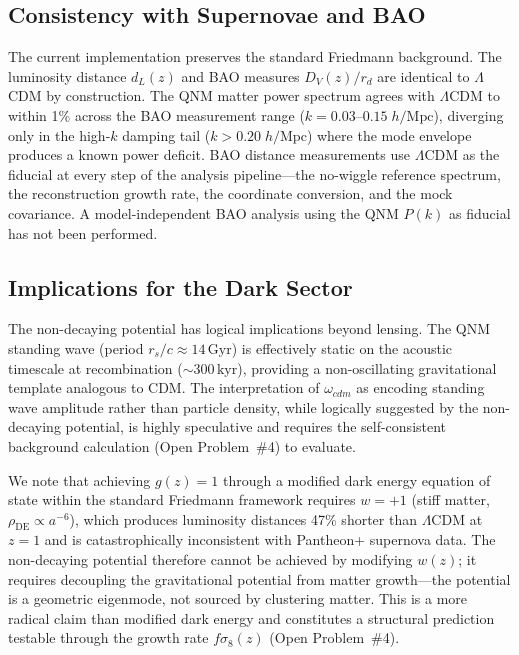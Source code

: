 \documentclass[aps,prd,twocolumn,superscriptaddress,showpacs,preprintnumbers,amsmath,amssymb,nofootinbib]{revtex4-2}
\newcommand{\lcdm}{$\Lambda$CDM}
\newcommand{\Gyr}{\,\mathrm{Gyr}}
\begin{document}
\subsection{Consistency with Supernovae and BAO}
\label{sec:sn_bao}

The current implementation preserves the standard Friedmann background. The luminosity distance $d_L(z)$ and BAO measures $D_V(z)/r_d$ are identical to \lcdm{} by construction. The QNM matter power spectrum agrees with \lcdm{} to within 1\% across the BAO measurement range ($k = 0.03$--$0.15\;h/\mathrm{Mpc}$), diverging only in the high-$k$ damping tail ($k > 0.20\;h/\mathrm{Mpc}$) where the mode envelope produces a known power deficit. BAO distance measurements use \lcdm{} as the fiducial at every step of the analysis pipeline---the no-wiggle reference spectrum, the reconstruction growth rate, the coordinate conversion, and the mock covariance. A model-independent BAO analysis using the QNM $P(k)$ as fiducial has not been performed.


\subsection{Implications for the Dark Sector}
\label{sec:dark}

The non-decaying potential has logical implications beyond lensing. The QNM standing wave (period $r_s/c \approx 14\Gyr$) is effectively static on the acoustic timescale at recombination ($\sim 300\,\mathrm{kyr}$), providing a non-oscillating gravitational template analogous to CDM. The interpretation of $\omega_{cdm}$ as encoding standing wave amplitude rather than particle density, while logically suggested by the non-decaying potential, is highly speculative and requires the self-consistent background calculation (Open Problem~\#4) to evaluate.

We note that achieving $g(z) = 1$ through a modified dark energy equation of state within the standard Friedmann framework requires $w = +1$ (stiff matter, $\rho_\mathrm{DE} \propto a^{-6}$), which produces luminosity distances 47\% shorter than \lcdm{} at $z = 1$ and is catastrophically inconsistent with Pantheon+ supernova data. The non-decaying potential therefore cannot be achieved by modifying $w(z)$; it requires decoupling the gravitational potential from matter growth---the potential is a geometric eigenmode, not sourced by clustering matter. This is a more radical claim than modified dark energy and constitutes a structural prediction testable through the growth rate $f\sigma_8(z)$ (Open Problem~\#4).
\end{document}
